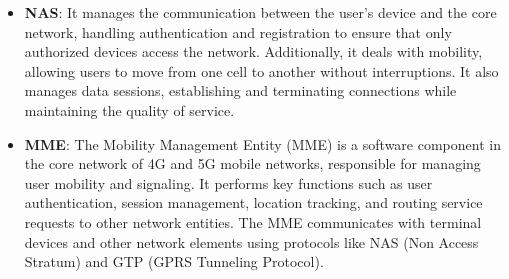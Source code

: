 \documentclass[english]{article}
\begin{document}
\begin{itemize}
	\item \textbf{\hypertarget{NAS}{NAS}}:
	      It manages the communication between the user's device and the core network,
	      handling authentication and registration to ensure that only authorized devices
	      access the network. Additionally, it deals with mobility, allowing users to move from
	      one cell to another without interruptions. It also manages data sessions, establishing
	      and terminating connections while maintaining the quality of service.

	\item \textbf{\hypertarget{MME}{MME}}:
	      The Mobility Management Entity (MME) is a software component in the core network of 4G
	      and 5G mobile networks, responsible for managing user mobility and signaling.
	      It performs key functions such as user authentication, session management, location tracking,
	      and routing service requests to other network entities. The MME communicates with terminal
	      devices and other network elements using protocols like NAS (Non Access Stratum) and GTP
	      (GPRS Tunneling Protocol). 
\end{itemize}
\clearpage
\printbibliography
\end{document}
